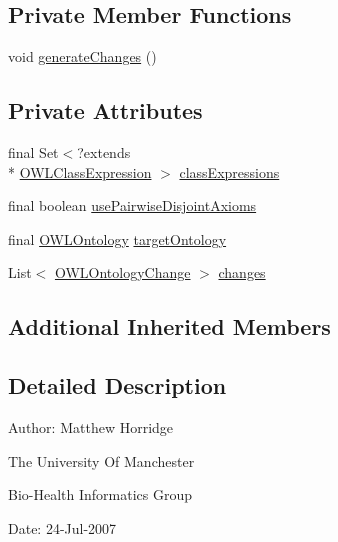 \subsection*{Private Member Functions}
\begin{DoxyCompactItemize}
\item 
void \hyperlink{classorg_1_1semanticweb_1_1owlapi_1_1_make_classes_mutually_disjoint_a04e6668f8470002fb81844b96393ab86}{generate\-Changes} ()
\end{DoxyCompactItemize}
\subsection*{Private Attributes}
\begin{DoxyCompactItemize}
\item 
final Set$<$?extends \\*
\hyperlink{interfaceorg_1_1semanticweb_1_1owlapi_1_1model_1_1_o_w_l_class_expression}{O\-W\-L\-Class\-Expression} $>$ \hyperlink{classorg_1_1semanticweb_1_1owlapi_1_1_make_classes_mutually_disjoint_a57759e02e23e59ab2eeb7912773669bf}{class\-Expressions}
\item 
final boolean \hyperlink{classorg_1_1semanticweb_1_1owlapi_1_1_make_classes_mutually_disjoint_a85748e7becd8aa020ef09bd443b3b5a3}{use\-Pairwise\-Disjoint\-Axioms}
\item 
final \hyperlink{interfaceorg_1_1semanticweb_1_1owlapi_1_1model_1_1_o_w_l_ontology}{O\-W\-L\-Ontology} \hyperlink{classorg_1_1semanticweb_1_1owlapi_1_1_make_classes_mutually_disjoint_af9da9ae856c808194f95400759c74d58}{target\-Ontology}
\item 
List$<$ \hyperlink{classorg_1_1semanticweb_1_1owlapi_1_1model_1_1_o_w_l_ontology_change}{O\-W\-L\-Ontology\-Change} $>$ \hyperlink{classorg_1_1semanticweb_1_1owlapi_1_1_make_classes_mutually_disjoint_a4824637c5e7a21e790c59261fa4dc0fa}{changes}
\end{DoxyCompactItemize}
\subsection*{Additional Inherited Members}


\subsection{Detailed Description}
Author\-: Matthew Horridge\par
 The University Of Manchester\par
 Bio-\/\-Health Informatics Group\par
 Date\-: 24-\/\-Jul-\/2007\par
\par
 

